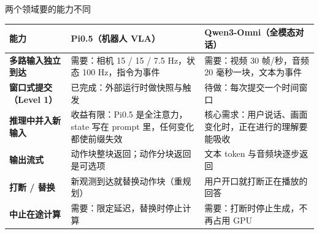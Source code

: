 \begin{frame}[t]{两个领域要的能力不同}
\scriptsize
\renewcommand{\arraystretch}{1.12}
\setlength{\tabcolsep}{3pt}
\begin{tabularx}{\textwidth}{>{\bfseries}p{2.6cm} Y Y}
\toprule
{}
能力 & Pi0.5（机器人 VLA） & Qwen3-Omni（全模态对话） \\
\midrule
多路输入独立到达 & 需要：相机 15 / 15 / 7.5 Hz，状态 100 Hz，指令为事件 & 需要：视频 30 帧/秒，音频 20 毫秒一块，文本为事件 \\
窗口式提交（Level 1） & 已完成：外部运行时做快照与触发 & 待做：每次提交一个时间窗口 \\
推理中并入新输入 & 收益有限：Pi0.5 是全注意力，state 写在 prompt 里，任何变化都使前缀失效 & 核心需求：用户说话、画面变化时，正在进行的理解要能吸收 \\
输出流式 & 动作块整块返回；动作分块返回是可选项 & 文本 token 与音频块逐步返回 \\
打断 / 替换 & 新观测到达就替换动作块（重规划） & 用户开口就打断正在播放的回答 \\
中止在途计算 & 需要：限定延迟，替换时停止计算 & 需要：打断时停止生成，不再占用 GPU \\
\bottomrule
\end{tabularx}
\par{}
\par{}
\end{frame}
